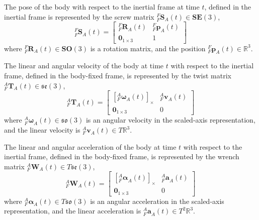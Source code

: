 		The pose of the body with respect to the inertial frame at time $t$, defined in the inertial frame is represented by the screw matrix ${^{F}_{F}\mathbf{S}^{}_{A}(t)} \in \mathbf{SE}(3)$,
		\begin{equation}
				{^{F}_{F}\mathbf{S}^{}_{A}(t)} = 
				\begin{bmatrix}
						  ^{F}_{F}\mathbf{R}^{}_{A}(t) 	& 	^{F}_{F}\mathbf{p}^{}_{A}(t)\\
						  \textbf{0}_{1 \times 3} & 1						  
				\end{bmatrix}
		\end{equation}
		where $^{F}_{F}\mathbf{R}^{}_{A}(t) \in \mathbf{SO}(3)$ is a rotation matrix, and the position $^{F}_{F}\mathbf{p}^{}_{A}(t) \in \mathbb{R}^3$.
		
		The linear and angular velocity of the body at time $t$ with respect to the inertial frame, defined in the body-fixed frame, is represented by the twist matrix ${^{A}_{F}\mathbf{T}^{}_{A}(t)} \in \mathfrak{se}(3)$,
		\begin{equation}
				{^{A}_{F}\mathbf{T}^{}_{A}(t)} = 
				\begin{bmatrix}
		  {[^{A}_{F}\mathbf{\omega}^{}_{A}(t)]_\times} 	& 	^{A}_{F}\mathbf{v}^{}_{A}(t)\\
		  \textbf{0}_{1 \times 3} & 0						  
				\end{bmatrix}
		\end{equation}
		where $^{A}_{F}\mathbf{\omega}^{}_{A}(t) \in \mathfrak{so}(3)$ is an angular velocity in the scaled-axis representation, and the linear velocity is $^{A}_{F}\mathbf{v}^{}_{A}(t) \in T\mathbb{R}^3$.
				
		The linear and angular acceleration of the body at time $t$ with respect to the inertial frame, defined in the body-fixed frame, is represented by the wrench matrix ${^{A}_{F}\mathbf{W}^{}_{A}(t)} \in T\mathfrak{se}(3)$,
		\begin{equation}
				{^{A}_{F}\mathbf{W}^{}_{A}(t)} = 
				\begin{bmatrix}
				  {[^{A}_{F}\mathbf{\alpha}^{}_{A}(t)]_\times} 	& 	^{A}_{F}\mathbf{a}^{}_{A}(t)\\
				  \textbf{0}_{1 \times 3} & 0						  
				\end{bmatrix}
		\end{equation}
		where $^{A}_{F}\mathbf{\alpha}^{}_{A}(t) \in  T\mathfrak{so}(3)$ is an angular acceleration in the scaled-axis representation, and the linear acceleration is $^{A}_{F}\mathbf{a}^{}_{A}(t) \in T^2\mathbb{R}^3$.
						
